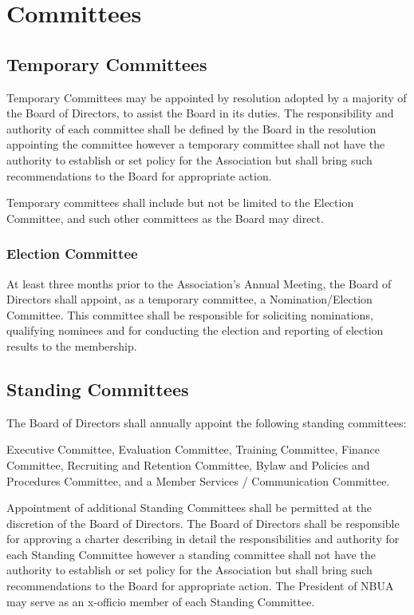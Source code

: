 \documentclass[letterpaper,11pt]{article}
\begin{document}
\section{Committees}
\subsection{Temporary Committees}
Temporary Committees may be appointed by resolution adopted by a majority of the Board of Directors, to assist the Board in its duties. The responsibility and authority of each committee shall be defined by the Board in the resolution appointing the committee however a temporary committee shall not have the authority to establish or set policy for the Association but shall bring such recommendations to the Board for appropriate action.

Temporary committees shall include but not be limited to the Election Committee, and such other committees as the Board may direct.
\subsubsection{Election Committee}
At least three months prior to the Association's Annual Meeting, the Board of Directors shall appoint, as a temporary committee, a Nomination/Election Committee. This committee shall be responsible for soliciting nominations, qualifying nominees and for conducting the election and reporting of election results to the membership.
\subsection{Standing Committees}
The Board of Directors shall annually appoint the following standing committees:

Executive Committee, Evaluation Committee, Training Committee, Finance Committee, Recruiting and Retention Committee, Bylaw and Policies and Procedures Committee, and a Member Services / Communication Committee. 

Appointment of additional Standing Committees shall be permitted at the discretion of the Board of Directors. The Board of Directors shall be responsible for approving a charter describing in detail the responsibilities and authority for each Standing Committee however a standing committee shall not have the authority to establish or set policy for the Association but shall bring such recommendations to the Board for appropriate action. The President of NBUA may serve as an x-officio member of each Standing Committee.
\end{document}
